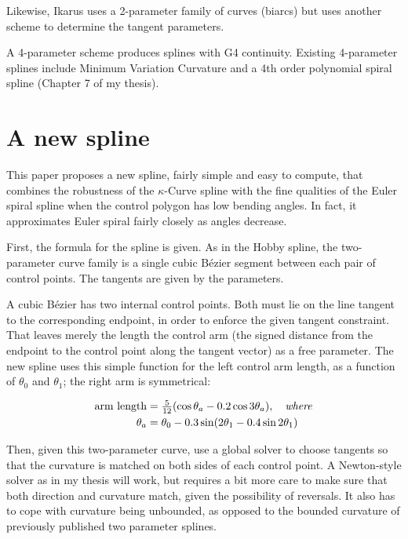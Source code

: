 \documentclass{article}
\newcommand{\kcurve}{$\kappa$-Curve}
\begin{document}
Likewise, Ikarus \cite{Karow87} uses a 2-parameter family of curves (biarcs) but uses another scheme to determine the tangent parameters.

A 4-parameter scheme produces splines with G4 continuity. Existing 4-parameter splines include Minimum Variation Curvature \cite{Moreton92} and a 4th order polynomial spiral spline (Chapter 7 of my thesis).

\section{A new spline}

This paper proposes a new spline, fairly simple and easy to compute, that combines the robustness of the \kcurve{} spline with the fine qualities of the Euler spiral spline when the control polygon has low bending angles. In fact, it approximates Euler spiral fairly closely as angles decrease.

First, the formula for the spline is given. As in the Hobby spline, the two-parameter curve family is a single cubic B{\'ezier} segment between each pair of control points. The tangents are given by the parameters.

A cubic B{\'e}zier has two internal control points. Both must lie on the line tangent to the corresponding endpoint, in order to enforce the given tangent constraint. That leaves merely the length the control arm (the signed distance from the endpoint to the control point along the tangent vector) as a free parameter. The new spline uses this simple function for the left control arm length, as a function of $\theta_0$ and $\theta_1$; the right arm is symmetrical:

\[
\begin{aligned}
\mbox{arm length} & = \tfrac{5}{12}(\cos \theta_a - 0.2\cos 3\theta_a), \quad \mbox{\emph{where}} \\
\theta_a & = \theta_0 - 0.3 \sin (2\theta_1 - 0.4\sin 2\theta_1) \\
\end{aligned}
\]

Then, given this two-parameter curve, use a global solver to choose tangents so that the curvature is matched on both sides of each control point. A Newton-style solver as in my thesis will work, but requires a bit more care to make sure that both direction and curvature match, given the possibility of reversals. It also has to cope with curvature being unbounded, as opposed to the bounded curvature of previously published two parameter splines.
\end{document}
